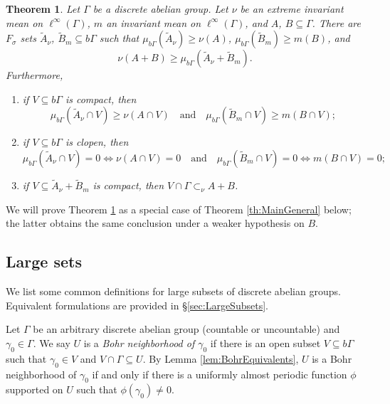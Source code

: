 \documentclass[12pt]{amsart} \usepackage{amsmath,centernot,amssymb,leftindex}
\newtheorem{theorem}{Theorem}
\numberwithin{theorem}{section}
\numberwithin{equation}{section}
\theoremstyle{definition}
\begin{document}
	\begin{theorem}\label{th:Main}
	Let $\Gamma$ be a discrete abelian group.  Let $\nu$ be an extreme invariant mean on $\ell^{\infty}(\Gamma)$, $m$ an invariant mean on $\ell^{\infty}(\Gamma)$, and $A$, $B\subseteq \Gamma$.  
	There are $F_{\sigma}$ sets $\tilde{A}_{\nu}$, $\tilde{B}_{m}\subseteq b\Gamma$  such that $\mu_{b\Gamma}(\tilde{A}_{\nu})\geq \nu(A)$, $\mu_{b\Gamma}(\tilde{B}_{m})\geq m(B)$, and
	\begin{equation}
		\nu(A+B)\geq \mu_{b\Gamma}(\tilde{A}_{\nu}+\tilde{B}_{m}).
	\end{equation}
	Furthermore,
		\begin{enumerate}
		\item\label{item:AVBV} if $V\subseteq b\Gamma$ is compact, then 
		\[\mu_{b\Gamma}(\tilde{A}_{\nu}\cap V)\geq \nu(A\cap V) \quad \text{and} \quad \mu_{b\Gamma}(\tilde{B}_{m}\cap V)\geq m(B\cap V);\]
		
						\item\label{item:VbGammaClopen} if $V\subseteq b\Gamma$ is clopen, then
	\[\mu_{b\Gamma}(\tilde{A}_{\nu}\cap V)=0\iff \nu(A\cap V)=0 \quad \text{and} \quad \mu_{b\Gamma}(\tilde{B}_{m}\cap V)=0\iff m(B\cap V)=0;\]
		
		\item\label{item:VcapGamma}  if $V\subseteq \tilde{A}_{\nu}+\tilde{B}_{m}$ is compact, then $V\cap \Gamma \subset_{\nu} A+B$.
		

		
		

	\end{enumerate}
	\end{theorem}
	We will prove Theorem \ref{th:Main} as a special case of Theorem \ref{th:MainGeneral} below; the latter obtains the same conclusion under a weaker hypothesis on $B$.


	

	
		\subsection{Large sets}\label{sec:JinBFW}   We list some common definitions for large  subsets of discrete abelian groups.  Equivalent formulations are provided in \S\ref{sec:LargeSubsets}.
	
	Let $\Gamma$ be an arbitrary discrete abelian group (countable or uncountable) and $\gamma_{0}\in \Gamma$.   We say $U$ is a \emph{Bohr neighborhood of $\gamma_{0}$} if there is an open subset $V\subseteq b\Gamma$ such that $\gamma_{0}\in V$ and $V\cap \Gamma \subseteq U$.  By Lemma \ref{lem:BohrEquivalents}, $U$ is a Bohr neighborhood of $\gamma_{0}$ if and only if there is a uniformly almost periodic function $\phi$ supported on $U$ such that
	 $\phi(\gamma_{0})\neq 0$.
	
\end{document}
